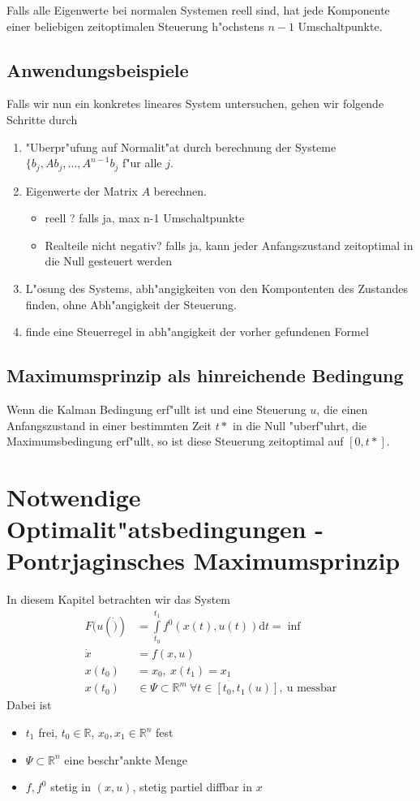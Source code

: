 \documentclass[pdftex,a4paper,oneside]{scrbook}
\begin{document}
Falls alle Eigenwerte bei normalen Systemen reell sind, hat jede Komponente einer beliebigen zeitoptimalen Steuerung h"ochstens $n-1$ Umschaltpunkte. 

\subsection{Anwendungsbeispiele}
Falls wir nun ein konkretes lineares System untersuchen, gehen wir folgende Schritte durch
\begin{enumerate}
	\item "Uberpr"ufung auf Normalit"at durch berechnung der Systeme $ \{b_j, A b_j, \dots, A^{n-1} b_j$ f"ur alle $j$. 
	\item Eigenwerte der Matrix $A$ berechnen. 
	\begin{itemize}
		\item reell ? falls ja, max n-1 Umschaltpunkte
		\item Realteile nicht negativ? falls ja, kann jeder Anfangszustand zeitoptimal in die Null gesteuert werden
	\end{itemize}
	\item L"osung des Systems, abh"angigkeiten von den Kompontenten des Zustandes finden, ohne Abh"angigkeit der Steuerung. 
	\item finde eine Steuerregel in abh"angigkeit der vorher gefundenen Formel
\end{enumerate}

\subsection{Maximumsprinzip als hinreichende Bedingung}

Wenn die Kalman Bedingung erf"ullt ist und eine Steuerung $u$, die einen Anfangszustand in einer bestimmten Zeit $t*$ in die Null "uberf"uhrt, die Maximumsbedingung erf"ullt, so ist diese Steuerung zeitoptimal auf $[0,t*]$. 

\section{Notwendige Optimalit"atsbedingungen - Pontrjaginsches Maximumsprinzip} 

In diesem Kapitel betrachten wir das System
\begin{align*}
	F(u(\dot)) & = \int\limits_{t_0}^{t_1} f^0 (x(t), u(t)) \mathrm{d}t = \inf \\
	\dot{x} & = f(x,u) \\
	x(t_0) & = x_0, \: x(t_1) = x_1 \\
	x(t_0) & \in \Psi \subset \mathbb{R}^m \: \forall t \in [t_0, t_1(u)], \: \text{u messbar}  
\end{align*}
Dabei ist 
\begin{itemize}
	\item $t_1$ frei, $t_0 \in \mathbb{R}$, $x_0, x_1 \in \mathbb{R}^n$ fest 
	\item $\Psi \subset \mathbb{R}^n$ eine beschr"ankte Menge
	\item $f, f^0$ stetig in $(x,u)$, stetig partiel diffbar in $x$
\end{itemize}
\end{document}
